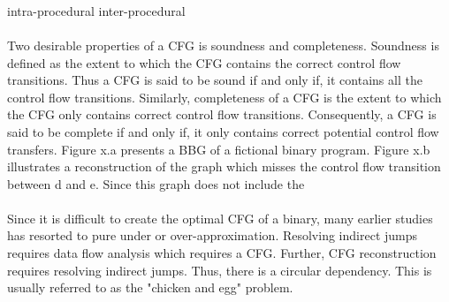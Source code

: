 \documentclass{kththesis}
\begin{document}
\\ \\
\\ \\
\\ \\
\\ \\
intra-procedural
inter-procedural
\\ \\
Two desirable properties of a CFG is soundness and completeness\cite{angr}. Soundness is defined as the extent to which the CFG contains the correct control flow transitions. Thus a CFG is said to be sound if and only if, it contains all the control flow transitions. Similarly, completeness of a CFG is the extent to which the CFG only contains correct control flow transitions. Consequently, a CFG is said to be complete if and only if, it only contains correct potential control flow transfers. Figure x.a presents a BBG of a fictional binary program. Figure x.b illustrates a reconstruction of the graph which misses the control flow transition between d and e. Since this graph does not include the  
\\ \\
Since it is difficult to create the optimal CFG of a binary, many earlier studies has resorted to pure under or over-approximation. %
Resolving indirect jumps requires data flow analysis which requires a CFG. Further, CFG reconstruction requires resolving indirect jumps. Thus, there is a circular dependency. This is usually referred to as the "chicken and egg" problem\cite{Jakstab}.

\end{document}

